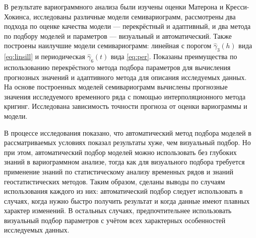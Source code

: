 В результате вариограммного анализа были изучены оценки Матерона и Кресси-Хокинса, исследованы различные модели семивариограмм, рассмотрены два подхода по оценке качества модели --- перекрёстный и адаптивный, и два метода по подбору моделей и параметров --- визуальный и автоматический. Также построены наилучшие модели семивариограмм: линейная с порогом $ \widehat{\gamma}_3(h) $ вида \eqref{eq:linsill} и периодическая $\widehat{\gamma}_6(t) $ вида \eqref{eq:per}. Показаны преимущества по использованию перекрёстного метода подбора параметров для вычисления прогнозных значений и адаптивного метода для описания исследуемых данных. На основе построенных моделей семивариограмм вычислены прогнозные значения исследуемого временного ряда с помощью интерполяционного метода кригинг. Исследована зависимость точности прогноза от оценки вариограммы и модели.

В процессе исследования показано, что автоматический метод подбора моделей в рассматриваемых условиях показал результаты хуже, чем визуальный подбор. Но при этом, автоматический подбор моделей можно использовать без глубоких знаний в вариограммном анализе, тогда как для визуального подбора требуется применение знаний по статистическому анализу временных рядов и знаний геостатистических методов. Таким образом, сделаны выводы по случаям использования каждого из них: автоматический подбор следует использовать в случаях, когда нужно быстро получить результат и когда данные имеют плавных характер изменений. В остальных случаях, предпочтительнее использовать визуальный подбор параметров с учётом всех характерных особенностей исследуемых данных.